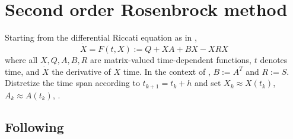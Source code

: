 \chapter{Second order Rosenbrock method}

Starting from the differential Riccati equation as in \cite{MPIMD11-06},
\begin{equation}
  \dot X = F(t, X) := Q + XA + BX - XRX
\end{equation}
where all $X, Q, A, B, R$ are matrix-valued time-dependent functions,
$t$ denotes time, and $\dot X$ the derivative of $X$ \wrt time.
In the context of \cite{Mena2007,MPIMD12-13,Lang2015}, $B:=A^T$ and $R:=S$.
Distretize the time span according to $t_{k+1} = t_k + h$
and set $X_k \approx X(t_k)$, $A_k \approx A(t_k)$, \etc.

\section{Following \cite{Mena2007}}

